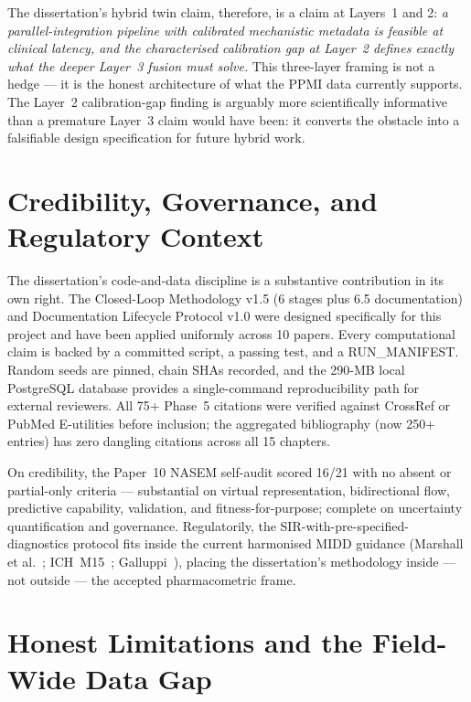 The dissertation's hybrid twin claim, therefore, is a claim at Layers~1 and 2: \emph{a parallel-integration pipeline with calibrated mechanistic metadata is feasible at clinical latency, and the characterised calibration gap at Layer~2 defines exactly what the deeper Layer~3 fusion must solve.} This three-layer framing is not a hedge --- it is the honest architecture of what the PPMI data currently supports. The Layer~2 calibration-gap finding is arguably more scientifically informative than a premature Layer~3 claim would have been: it converts the obstacle into a falsifiable design specification for future hybrid work.

\section{Credibility, Governance, and Regulatory Context}
\label{sec:disc-credibility}

The dissertation's code-and-data discipline is a substantive contribution in its own right. The Closed-Loop Methodology v1.5 (6 stages plus 6.5 documentation) and Documentation Lifecycle Protocol v1.0 were designed specifically for this project and have been applied uniformly across 10 papers. Every computational claim is backed by a committed script, a passing test, and a RUN\_MANIFEST. Random seeds are pinned, chain SHAs recorded, and the 290-MB local PostgreSQL database provides a single-command reproducibility path for external reviewers. All 75+ Phase~5 citations were verified against CrossRef or PubMed E-utilities before inclusion; the aggregated bibliography (now 250+ entries) has zero dangling citations across all 15 chapters.

On credibility, the Paper~10 NASEM self-audit scored 16/21 with no absent or partial-only criteria --- substantial on virtual representation, bidirectional flow, predictive capability, validation, and fitness-for-purpose; complete on uncertainty quantification and governance. Regulatorily, the SIR-with-pre-specified-diagnostics protocol fits inside the current harmonised MIDD guidance (Marshall et al.~\cite{marshall2016goodpractices,marshall2019midd,marshall2023harmonized}; ICH~M15~\cite{ich_m15_2024}; Galluppi~\cite{galluppi2024midd}), placing the dissertation's methodology inside --- not outside --- the accepted pharmacometric frame.

\section{Honest Limitations and the Field-Wide Data Gap}
\label{sec:disc-limitations}

